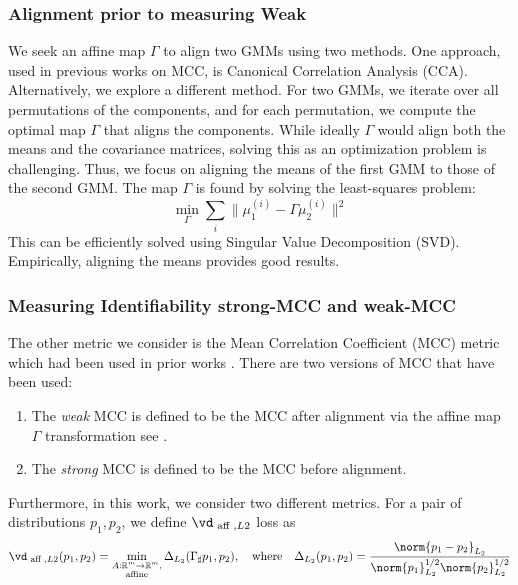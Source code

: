 \documentclass{article} %
\theoremstyle{plain}
\theoremstyle{definition}
\theoremstyle{remark}
\numberwithin{equation}{section}
\begin{document}
\subsubsection{Alignment prior to measuring Weak \MCC}\label{app:alignement}
We seek an affine map \( \Gamma \) to align two GMMs using two methods. One approach, used in previous works on MCC, is Canonical Correlation Analysis (CCA). Alternatively, we explore a different method. For two GMMs, we iterate over all permutations of the components, and for each permutation, we compute the optimal map \( \Gamma \) that aligns the components. While ideally \( \Gamma \) would align both the means and the covariance matrices, solving this as an optimization problem is challenging. Thus, we focus on aligning the means of the first GMM to those of the second GMM. The map \( \Gamma \) is found by solving the least-squares problem:
\begin{equation}
\min_{\Gamma} \sum_{i} \| \mu_1^{(i)} - \Gamma \mu_2^{(i)} \|^2
\end{equation}
This can be efficiently solved using Singular Value Decomposition (SVD). Empirically, aligning the means provides good results.


\subsubsection{Measuring Identifiability strong-MCC and weak-MCC}
The other metric we consider is the Mean Correlation Coefficient (MCC) metric which had been used in prior works \citep{iVAEkhemakhem20a}. There are two versions of MCC that have been used:
\begin{enumerate}
    \item The \emph{weak} MCC is defined to be the MCC after alignment via the affine map $\Gamma$ transformation see .
    \item The \emph{strong} MCC is defined to be the MCC before alignment.
\end{enumerate}

Furthermore, in this work, we consider two different metrics.
For a pair of distributions $p_1, p_2$, we define $\vd_{\text{ aff }, L2}$ loss as
\begin{equation}
  \vd_{\text{ aff }, L2}(p_1, p_2) =  \min\limits_{\substack{A:\mathbb{R}^m\rightarrow \mathbb{R}^m,\\ \text{affine}}} 
  \Delta_{L_2}(\Gamma_{\sharp}p_1, p_2), \quad \text{where}\quad   \Delta_{L_2}(p_1, p_2) = \dfrac{ \norm{p_1 - p_2}_{L_2}}{\norm{p_1}^{1/2}_{L_2}\norm{p_2}_{L_2}^{1/2}}
\end{equation}
\end{document}
